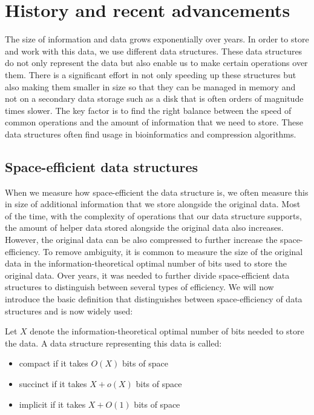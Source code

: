 \chapter{History and recent advancements}
\label{kap:kap1}

The size of information and data grows exponentially over years. In order to store and work with this data, we use different data structures. These data structures do not only represent the data but also enable us to make certain operations over them. There is a significant effort in not only speeding up these structures but also making them smaller in size so that they can be managed in memory and not on a secondary data storage such as a disk that is often orders of magnitude times slower. The key factor is to find the right balance between the speed of common operations and the amount of information that we need to store. These data structures often find usage in bioinformatics and compression algorithms.

\section{Space-efficient data structures}

When we measure how space-efficient the data structure is, we often measure this in size of additional information that we store alongside the original data. Most of the time, with the complexity of operations that our data structure supports, the amount of helper data stored alongside the original data also increases. However, the original data can be also compressed to further increase the space-efficiency. To remove ambiguity, it is common to measure the size of the original data in the information-theoretical optimal number of bits used to store the original data. Over years, it was needed to further divide space-efficient data structures to distinguish between several types of efficiency. We will now introduce the basic definition that distinguishes between space-efficiency of data structures and is now widely used:

\begin{theorem}
Let $X$ denote the information-theoretical optimal number of bits needed to store the data. A data structure representing this data is called:
\begin{itemize}
    \item compact if it takes $O(X)$ bits of space
    \item succinct if it takes $X + o(X)$ bits of space
    \item implicit if it takes $X + O(1)$ bits of space
\end{itemize}
\end{theorem}

